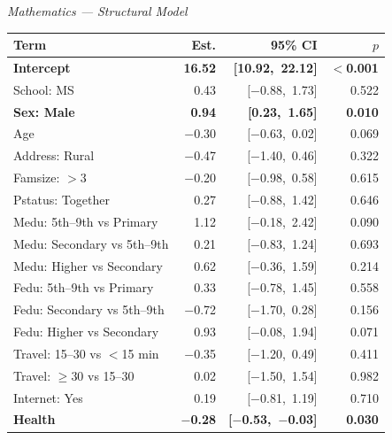 \documentclass{article}
\begin{document}
\vspace{-1em}\noindent
\begin{minipage}[t]{0.49\textwidth}
\centering
\scriptsize
\textit{Mathematics --- Structural Model}\\[4pt]
\begin{tabularx}{\textwidth}{Xrrr}
\toprule
\textbf{Term} & \textbf{Est.} & \textbf{95\% CI} & \textbf{$p$} \\
\midrule
\textbf{Intercept}            & \textbf{16.52} & \textbf{[10.92,\ 22.12]} & \textbf{$<$0.001} \\
School: MS                    &  0.43 & [$-$0.88,\ 1.73] & 0.522 \\
\textbf{Sex: Male}            & \textbf{0.94} & \textbf{[0.23,\ 1.65]} & \textbf{0.010} \\
Age                           & $-$0.30 & [$-$0.63,\ 0.02] & 0.069 \\
Address: Rural                & $-$0.47 & [$-$1.40,\ 0.46] & 0.322 \\
Famsize: $>$3                 & $-$0.20 & [$-$0.98,\ 0.58] & 0.615 \\
Pstatus: Together             &  0.27 & [$-$0.88,\ 1.42] & 0.646 \\
Medu: 5th--9th vs Primary     &  1.12 & [$-$0.18,\ 2.42] & 0.090 \\
Medu: Secondary vs 5th--9th   &  0.21 & [$-$0.83,\ 1.24] & 0.693 \\
Medu: Higher vs Secondary     &  0.62 & [$-$0.36,\ 1.59] & 0.214 \\
Fedu: 5th--9th vs Primary     &  0.33 & [$-$0.78,\ 1.45] & 0.558 \\
Fedu: Secondary vs 5th--9th   & $-$0.72 & [$-$1.70,\ 0.28] & 0.156 \\
Fedu: Higher vs Secondary     &  0.93 & [$-$0.08,\ 1.94] & 0.071 \\
Travel: 15--30 vs $<$15 min   & $-$0.35 & [$-$1.20,\ 0.49] & 0.411 \\
Travel: $\geq$30 vs 15--30    &  0.02 & [$-$1.50,\ 1.54] & 0.982 \\
Internet: Yes                 &  0.19 & [$-$0.81,\ 1.19] & 0.710 \\
\textbf{Health}               & \textbf{$-$0.28} & \textbf{[$-$0.53,\ $-$0.03]} & \textbf{0.030} \\
\bottomrule
\end{tabularx}
\end{minipage}
\hfill
\end{document}
